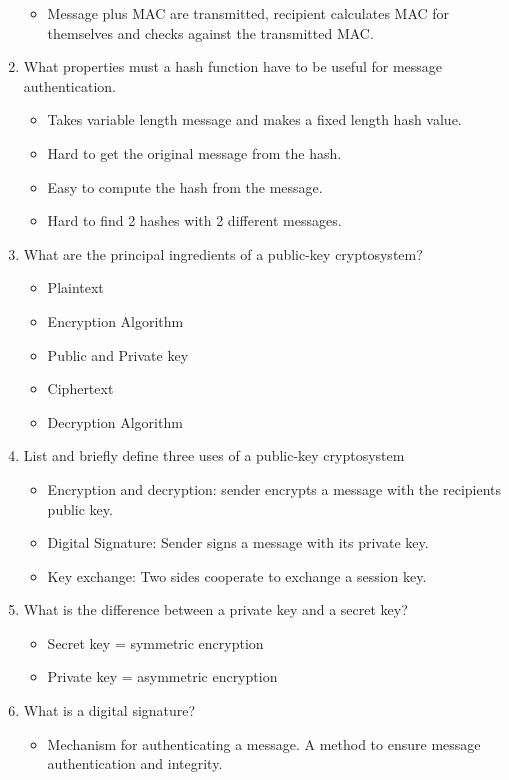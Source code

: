 \documentclass[12pt]{article}
\begin{document}
\begin{enumerate}[label=Q2.\arabic*]
\begin{itemize}
				\item  Message plus MAC are transmitted, recipient calculates MAC for themselves and checks against the transmitted MAC.
			\end{itemize}
		\item What properties must a hash function have to be useful for message authentication.
			\begin{itemize}
				\item Takes variable length message and makes a fixed length hash value.
				\item Hard to get the original message from the hash.
				\item Easy to compute the hash from the message.
				\item Hard to find 2 hashes with 2 different messages.
			\end{itemize}
		\item What are the principal ingredients of a public-key cryptosystem?
			\begin{itemize}
				\item Plaintext
				\item Encryption Algorithm
				\item Public and Private key
				\item Ciphertext
				\item Decryption Algorithm
			\end{itemize}
		\item List and briefly define three uses of a public-key cryptosystem
			\begin{itemize}
				\item Encryption and decryption: sender encrypts a message with the recipients public key.
				\item Digital Signature: Sender signs a message with its private key.
				\item Key exchange: Two sides cooperate to exchange a session key.
			\end{itemize}
		\item What is the difference between a private key and a secret key?
			\begin{itemize}
				\item Secret key = symmetric encryption
				\item Private key = asymmetric encryption
			\end{itemize}
		\item What is a digital signature?
			\begin{itemize}
				\item Mechanism for authenticating a message. A method to ensure message authentication and integrity.

\end{itemize}
\end{enumerate}
\end{document}
